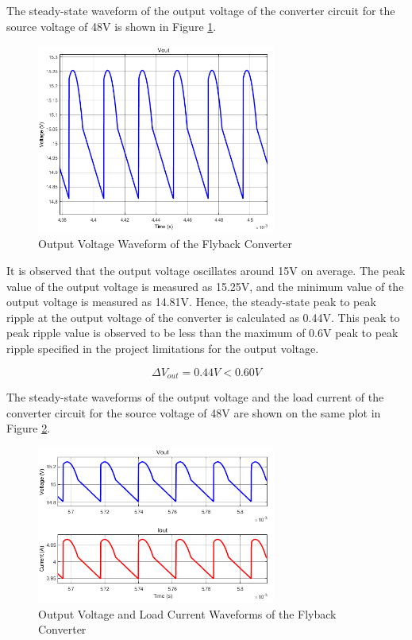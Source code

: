 The steady-state waveform of the output voltage of the converter circuit for the source voltage of 48V is shown in Figure \ref{fig:out48}.

\begin{figure}[H]
\begin{center}
\includegraphics[width=0.7\textwidth]{figures/Vout_48.png}
\caption{Output Voltage Waveform of the Flyback Converter}
\label{fig:out48}
\end{center}
\end{figure}

It is observed that the output voltage oscillates around 15V on average. The peak value of the output voltage is measured as 15.25V, and the minimum value of the output voltage is measured as 14.81V. Hence, the steady-state peak to peak ripple at the output voltage of the converter is calculated as 0.44V. This peak to peak ripple value is observed to be less than the maximum of 0.6V peak to peak ripple specified in the project limitations for the output voltage.

$$ \Delta V_{out} = 0.44V < 0.60V $$

The steady-state waveforms of the output voltage and the load current of the converter circuit for the source voltage of 48V are shown on the same plot in Figure \ref{fig:viout_48}.

\begin{figure}[H]
\begin{center}
\includegraphics[width=0.7\textwidth]{figures/V_I_out_48.png}
\caption{Output Voltage and Load Current Waveforms of the Flyback Converter}
\label{fig:viout_48}
\end{center}
\end{figure}

